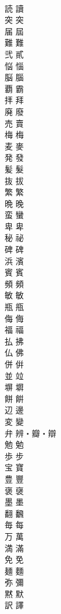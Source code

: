 \documentclass[8pt]{extreport}
\begin{document}
\begin{CJK}{UTF8}{min}
\\	読	讀
\\	突	突
\\	届	屆
\\	難	難
\\	弐	貳
\\	悩	惱
\\	脳	腦
\\	覇	霸
\\	拝	拜
\\	廃	廢
\\	売	賣
\\	梅	梅
\\	麦	麥
\\	発	發
\\	髪	髮
\\	抜	拔
\\	繁	繁
\\	晩	晚
\\	蛮	蠻
\\	卑	卑
\\	秘	祕
\\	碑	碑
\\	浜	濱
\\	賓	賓
\\	頻	頻
\\	敏	敏
\\	瓶	甁
\\	侮	侮
\\	福	福
\\	払	拂
\\	仏	佛
\\	併	倂
\\	並	竝
\\	塀	塀
\\	餅	餠
\\	辺	邊
\\	変	變
\\	弁	辨・瓣・辯
\\	勉	勉
\\	歩	步
\\	宝	寶
\\	豊	豐
\\	褒	襃
\\	墨	墨
\\	翻	飜
\\	毎	每
\\	万	萬
\\	満	滿
\\	免	免
\\	麺	麵
\\	弥	彌
\\	黙	默
\\	訳	譯

\end{CJK}
\end{document}
